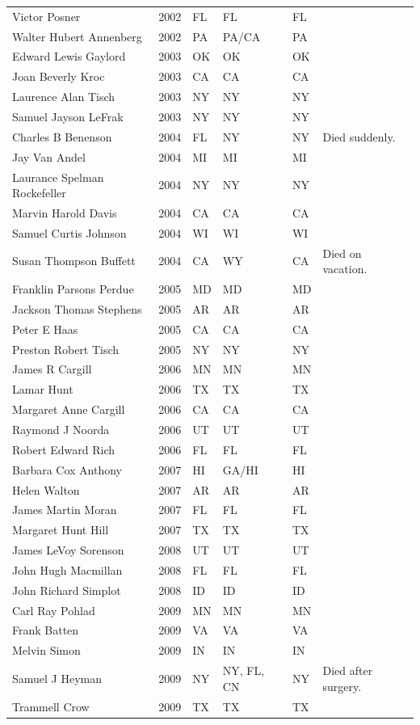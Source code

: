\documentclass[12pt]{article}
\begin{document}
{\begin{longtable}{l l l l l l}
		Victor Posner&2002&FL&FL&FL&\\
		Walter Hubert Annenberg&2002&PA&PA/CA&PA&\\
		Edward Lewis Gaylord&2003&OK&OK&OK&\\
		Joan Beverly Kroc&2003&CA&CA&CA&\\
		Laurence Alan Tisch&2003&NY&NY&NY&\\
		Samuel Jayson LeFrak&2003&NY&NY&NY&\\
		Charles B Benenson&2004&FL&NY&NY&Died suddenly.\\
		Jay Van Andel&2004&MI&MI&MI&\\
		Laurance Spelman Rockefeller&2004&NY&NY&NY&\\
		Marvin Harold Davis&2004&CA&CA&CA&\\
		Samuel Curtis Johnson&2004&WI&WI&WI&\\
		Susan Thompson Buffett&2004&CA&WY&CA&Died on vacation.\\
		Franklin Parsons Perdue&2005&MD&MD&MD&\\
		Jackson Thomas Stephens&2005&AR&AR&AR&\\
		Peter E Haas&2005&CA&CA&CA&\\
		Preston Robert Tisch&2005&NY&NY&NY&\\
		James R Cargill&2006&MN&MN&MN&\\
		Lamar Hunt&2006&TX&TX&TX&\\
		Margaret Anne Cargill&2006&CA&CA&CA&\\
		Raymond J Noorda&2006&UT&UT&UT&\\
		Robert Edward Rich&2006&FL&FL&FL&\\
		Barbara Cox Anthony&2007&HI&GA/HI&HI&\\
		Helen Walton&2007&AR&AR&AR&\\
		James Martin Moran&2007&FL&FL&FL&\\
		Margaret Hunt Hill&2007&TX&TX&TX&\\
		James LeVoy Sorenson&2008&UT&UT&UT&\\
		John Hugh Macmillan&2008&FL&FL&FL&\\
		John Richard Simplot&2008&ID&ID&ID&\\
		Carl Ray Pohlad&2009&MN&MN&MN&\\
		Frank Batten&2009&VA&VA&VA&\\
		Melvin Simon&2009&IN&IN&IN&\\
		Samuel J Heyman&2009&NY&NY, FL, CN&NY&Died after surgery.\\
		Trammell Crow&2009&TX&TX&TX&\\

\end{longtable}}
\end{document}

